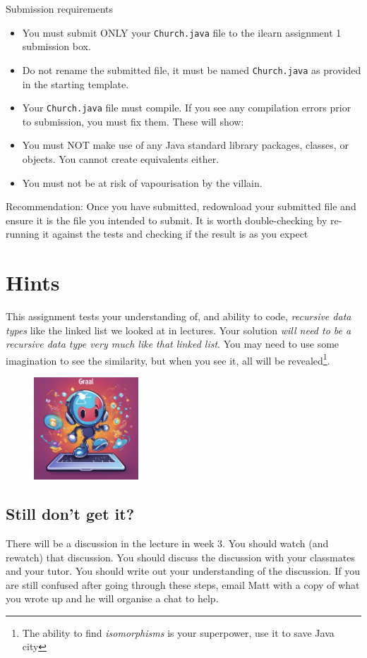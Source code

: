 \documentclass[twoside=false,DIV=14]{scrartcl}
\begin{document}
Submission requirements
\begin{itemize}
  \item You must submit ONLY your \lstinline{Church.java} file to the ilearn assignment 1 submission box.
  \item Do not rename the submitted file, it must be named \lstinline{Church.java} as provided in the starting template.
  \item Your \lstinline{Church.java} file must compile. If you see any compilation errors prior to submission, you must fix them. These will show:
  \item You must NOT make use of any Java standard library packages, classes, or objects. You cannot create equivalents either.
  \item You must not be at risk of vapourisation by the villain.
\end{itemize}
Recommendation: Once you have submitted, redownload your submitted file
and ensure it is the file you intended to submit. It is worth double-checking by re-running it against the tests and checking if the result is as you expect

\section{Hints}
This assignment tests  your understanding of, and ability to code, \emph{recursive data types} like the linked list we looked at in lectures.  Your solution \emph{will need to be a recursive data type very much like that linked list}.  You may need to use some imagination to see the similarity, but when you see it, all will be revealed\footnote{The ability to find \emph{isomorphisms} is your superpower, use it to save Java city}.

\begin{figure} %
  \centering
  \includegraphics[width=0.35\textwidth]{graal.jpg}
\end{figure}


\subsection{Still don't get it?}
There will be a discussion in the lecture in week 3.  You should watch (and rewatch) that discussion.  You should discuss the discussion with your classmates and your tutor.  You should write out your understanding of the discussion.  If you are still confused after going through these steps, email Matt with a copy of what you wrote up and he will organise a chat to help.
\end{document}
